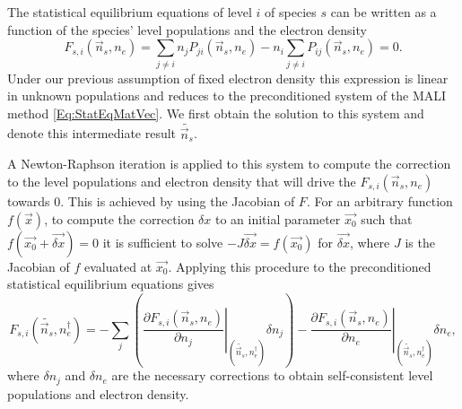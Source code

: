 The statistical equilibrium equations of level $i$ of species $s$ can be written as a function of the species' level populations and the electron density
\begin{equation}
    \label{Eq:EseFn}
    F_{s, i}(\vec{n}_s, n_e) = \sum_{j\neq i} n_j P_{ji}(\vec{n}_s, n_e) - n_i\sum_{j\neq i} P_{ij}(\vec{n}_s, n_e) = 0.
\end{equation}
Under our previous assumption of fixed electron density this expression is linear in unknown populations and reduces to the preconditioned system of the MALI method \eqref{Eq:StatEqMatVec}.
We first obtain the solution to this system and denote this intermediate result $\widetilde{\vec{n}_s}$.

A Newton-Raphson iteration is applied to this system to compute the correction to the level populations and electron density that will drive the $F_{s,i}(\vec{n}_s, n_e)$ towards 0.
This is achieved by using the Jacobian of $F$.
For an arbitrary function $f(\vec{x})$, to compute the correction $\delta x$ to an initial parameter $\vec{x_0}$ such that $f(\vec{x_0} + \vec{\delta x}) = 0$ it is sufficient to solve $-J\vec{\delta x} = f(\vec{x_0})$ for $\vec{\delta x}$, where $J$ is the Jacobian of $f$ evaluated at $\vec{x_0}$.
Applying this procedure to the preconditioned statistical equilibrium equations gives
\begin{equation}
    \label{Eq:LinNr}
    F_{s, i}(\widetilde{\vec{n}_s}, n_e^\dagger) =
    - \sum_j \left( \left.\frac{\partial F_{s,i}(\vec{n}_s, n_e)}{\partial n_j}\right\rvert_{(\widetilde{\vec{n}_s}, n_e^\dagger)} \delta n_j \right)
    - \left.\frac{\partial F_{s,i}(\vec{n}_s, n_e)}{\partial n_e}\right\rvert_{(\widetilde{\vec{n}_s}, n_e^\dagger)} \delta n_e,
\end{equation}
where $\delta n_j$ and $\delta n_e$ are the necessary corrections to obtain self-consistent level populations and electron density.

